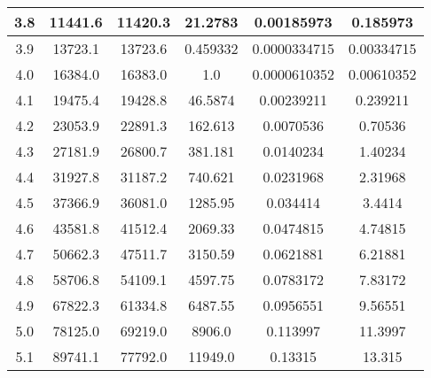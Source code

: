 \begin{table}[h!]
\begin{tabular}{|c|c|c|c|c|c|}
        3.8        & 11441.6        & 11420.3                                          & 21.2783      & 0.00185973        & 0.185973          \\ \hline
        3.9        & 13723.1        & 13723.6                                          & 0.459332     & 0.0000334715      & 0.00334715        \\ \hline
        4.0        & 16384.0        & 16383.0                                          & 1.0          & 0.0000610352      & 0.00610352        \\ \hline
        4.1        & 19475.4        & 19428.8                                          & 46.5874      & 0.00239211        & 0.239211          \\ \hline
        4.2        & 23053.9        & 22891.3                                          & 162.613      & 0.0070536         & 0.70536           \\ \hline
        4.3        & 27181.9        & 26800.7                                          & 381.181      & 0.0140234         & 1.40234           \\ \hline
        4.4        & 31927.8        & 31187.2                                          & 740.621      & 0.0231968         & 2.31968           \\ \hline
        4.5        & 37366.9        & 36081.0                                          & 1285.95      & 0.034414          & 3.4414            \\ \hline
        4.6        & 43581.8        & 41512.4                                          & 2069.33      & 0.0474815         & 4.74815           \\ \hline
        4.7        & 50662.3        & 47511.7                                          & 3150.59      & 0.0621881         & 6.21881           \\ \hline
        4.8        & 58706.8        & 54109.1                                          & 4597.75      & 0.0783172         & 7.83172           \\ \hline
        4.9        & 67822.3        & 61334.8                                          & 6487.55      & 0.0956551         & 9.56551           \\ \hline
        5.0        & 78125.0        & 69219.0                                          & 8906.0       & 0.113997          & 11.3997           \\ \hline
        5.1        & 89741.1        & 77792.0                                          & 11949.0      & 0.13315           & 13.315            \\ \hline
    \end{tabular}\label{tab:table3}
\end{table}
